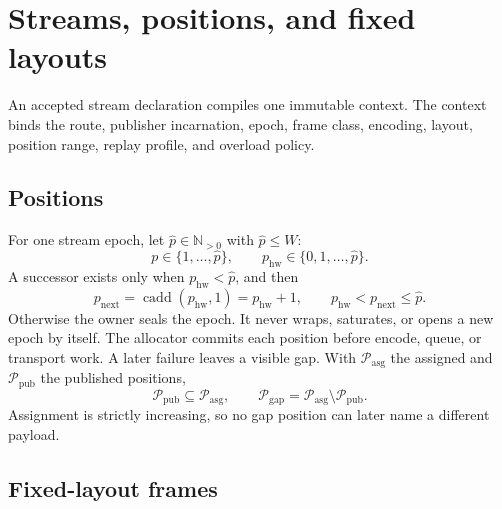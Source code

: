 \documentclass[11pt,a4paper]{article}
\theoremstyle{definition}
\newcommand{\cadd}{\operatorname{cadd}}
\begin{document}
\section{Streams, positions, and fixed layouts}


An accepted stream declaration compiles one immutable context. The context binds the
route, publisher incarnation, epoch, frame class, encoding, layout, position range,
replay profile, and overload policy.

\subsection{Positions}

For one stream epoch, let $\hat p\in\mathbb{N}_{>0}$ with $\hat p\leq W$:
\begin{equation}\label{eq:position-domain}
p\in\{1,\ldots,\hat p\},\qquad p_{\mathrm{hw}}\in\{0,1,\ldots,\hat p\}.
\end{equation}
A successor exists only when $p_{\mathrm{hw}}<\hat p$, and then
\begin{equation}\label{eq:position-successor}
p_{\mathrm{next}}=\cadd(p_{\mathrm{hw}},1)=p_{\mathrm{hw}}+1,\qquad
p_{\mathrm{hw}}<p_{\mathrm{next}}\leq\hat p.
\end{equation}
Otherwise the owner seals the epoch. It never wraps, saturates, or opens a new epoch
by itself. The allocator commits each position before encode, queue, or transport work.
A later failure leaves a visible gap. With $\mathcal{P}_{\mathrm{asg}}$ the assigned
and $\mathcal{P}_{\mathrm{pub}}$ the published positions,
\begin{equation}\label{eq:gap-set}
\mathcal{P}_{\mathrm{pub}}\subseteq\mathcal{P}_{\mathrm{asg}},\qquad
\mathcal{P}_{\mathrm{gap}}=\mathcal{P}_{\mathrm{asg}}\setminus\mathcal{P}_{\mathrm{pub}}.
\end{equation}
Assignment is strictly increasing, so no gap position can later name a different
payload.

\subsection{Fixed-layout frames}
\end{document}
